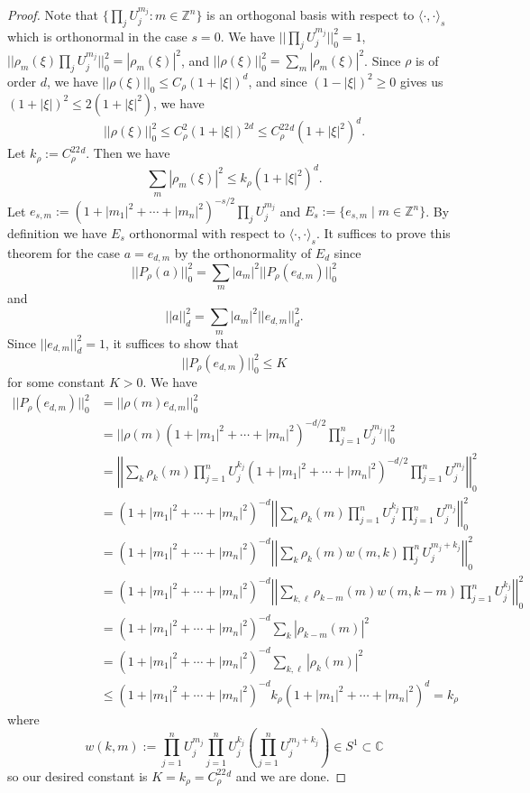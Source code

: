 \documentclass[10pt]{article}
\theoremstyle{remark}
\theoremstyle{definition}
\begin{document}
\begin{proof}
Note that $\{\prod_jU_j^{m_j}:m\in\mathbb Z^n\}$
is an orthogonal basis with respect to
$\langle\cdot,\cdot\rangle_s$ which is orthonormal in the case $s=0$.
We have
$||\prod_jU_j^{m_j}||_0^2=1$,
$||\rho_m(\xi)\prod_jU_j^{m_j}||_0^2=|\rho_m(\xi)|^2$,
and $||\rho(\xi)||_0^2=\sum_m|\rho_m(\xi)|^2$.
Since $\rho$ is of order $d$, we have
$||\rho(\xi)||_0\le C_{\rho}(1+|\xi|)^d$, and
since $(1-|\xi|)^2\ge 0$ gives us $(1+|\xi|)^2\le 2(1+|\xi|^2)$, we have
$$||\rho(\xi)||_0^2\le C_{\rho}^2(1+|\xi|)^{2d}\le C_{\rho}^22^d(1+|\xi|^2)^d.$$
Let $k_{\rho}:=C_{\rho}^22^d$. Then we have
$$\sum_m|\rho_m(\xi)|^2\le k_{\rho}(1+|\xi|^2)^d.$$
Let $e_{s,m}:=(1+|m_1|^2+\cdots+|m_n|^2)^{-s/2}\prod_jU_j^{m_j}$ and
$E_s:=\{e_{s,m}\mid m\in\mathbb Z^n\}$. By definition we have $E_s$
orthonormal with respect to $\langle\cdot,\cdot\rangle_s$. It suffices to
prove this theorem for the case $a=e_{d,m}$ by the orthonormality of $E_d$
since
$$||P_{\rho}(a)||_0^2=\sum_m|a_m|^2||P_{\rho}(e_{d,m})||_0^2$$
and
$$||a||_d^2=\sum_m|a_m|^2||e_{d,m}||_d^2.$$
Since $||e_{d,m}||_d^2=1$, it suffices to show that
$$||P_{\rho}(e_{d,m})||_0^2\le K$$ for some constant $K>0$.
We have
\begin{align*}
||P_{\rho}(e_{d,m})||_0^2
&= ||\rho(m)e_{d,m}||_0^2 \\
&= ||\rho(m)(1+|m_1|^2+\cdots+|m_n|^2)^{-d/2}\prod_{j=1}^nU_j^{m_j}||_0^2 \\
&= \left|\left|\sum_k
\rho_k(m)\prod_{j=1}^nU_j^{k_j}
(1+|m_1|^2+\cdots+|m_n|^2)^{-d/2}\prod_{j=1}^nU_j^{m_j}
\right|\right|_0^2 \\
&= (1+|m_1|^2+\cdots+|m_n|^2)^{-d}\left|\left|\sum_k
\rho_k(m)\prod_{j=1}^nU_j^{k_j}\prod_{j=1}^nU_j^{m_j}\right|\right|_0^2 \\
&= (1+|m_1|^2+\cdots+|m_n|^2)^{-d}\left|\left|\sum_k
\rho_k(m)w(m,k)\prod_j^nU_j^{m_j+k_j}
\right|\right|_0^2 \\
&= (1+|m_1|^2+\cdots+|m_n|^2)^{-d}\left|\left|\sum_{k,\ell}
\rho_{k-m}(m)w(m,k-m)\prod_{j=1}^nU_j^{k_j}
\right|\right|_0^2 \\
&= (1+|m_1|^2+\cdots+|m_n|^2)^{-d}
\sum_k|\rho_{k-m}(m)|^2 \\
&= (1+|m_1|^2+\cdots+|m_n|^2)^{-d}
\sum_{k,\ell}|\rho_k(m)|^2 \\
&\le (1+|m_1|^2+\cdots+|m_n|^2)^{-d}k_{\rho}(1+|m_1|^2+\cdots+|m_n|^2)^d
=k_{\rho}
\end{align*}
where $$w(k,m):=\prod_{j=1}^nU_j^{m_j}\prod_{j=1}^nU_j^{k_j}
\left(\prod_{j=1}^nU_j^{m_j+k_j}\right)\in S^1\subset\mathbb C$$
so our desired constant is $K=k_{\rho}=C_{\rho}^22^d$ and we are done.
\end{proof}
\end{document}
